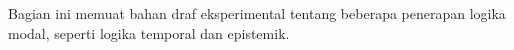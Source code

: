 \documentclass[../../include/open-logic-part]{subfiles}
\begin{document}

\begin{editorial}
Bagian ini memuat bahan draf eksperimental tentang beberapa penerapan logika
modal, seperti logika temporal dan epistemik.
\end{editorial}



\OLEndPartHook
\end{document}
